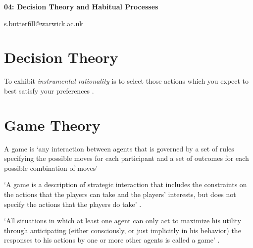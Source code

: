 \documentclass[12pt]{extarticle}
\date{}
\makeatletter
\def \ititle {Philosophical Psychology}
\def \iemail{s.butterfill@warwick.ac.uk}
\makeatother
\begin{document}
\begin{multicols*}{3}

\setlength\footnotesep{1em}











\def \ititle {04: Decision Theory and Habitual Processes}

\begin{center}

{\Large

\textbf{\ititle}

}



\iemail %

\end{center}




 
 
\section{Decision Theory}
 
 
To exhibit \emph{instrumental rationality} is to select those actions which you expect to best satisfy your preferences \citep[textbook:][]{Jeffrey:1983oe}.



\section{Game Theory}
A game is ‘any interaction between agents that is governed by a set of rules 
specifying the possible moves for each participant and a set of outcomes for each possible combination of moves’
\citep[p.~3]{hargreaves:2004_game}
 
‘A game is a description of strategic interaction that includes the constraints on the actions that the players can take and the players’ interests, but does not specify the actions that the players do take’
\citep[p.~2]{osborne:1994_game}.
 
‘All situations in which at least one agent can only act to maximize his utility through anticipating (either consciously, or just implicitly in his behavior) the responses to his actions by one or more other agents is called a game’
\citep{ross:2018_game}.



\end{multicols*}
\end{document}
